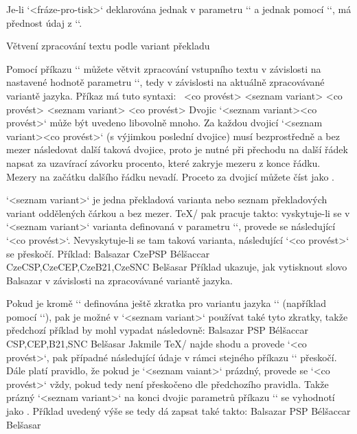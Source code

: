 Je-li `<fráze-pro-tisk>` deklarována jednak v parametru `\Note` a jednak
pomocí `\wdef`, má přednost údaj z `\wdef`.

\secc Větvení zpracování textu podle variant překladu

\mnote{\code{\\switch}}
Pomocí příkazu `\switch` můžete větvit zpracování vstupního textu v
závislosti na nastavené hodnotě parametru `\tmark`, tedy v závislosti na
aktuálně zpracovávané variantě jazyka. Příkaz má tuto syntaxi:
\begtt
{} {<co provést>}%
        {<seznam variant>} {<co provést>}%
        {<seznam variant>} {<co provést>}
\endtt
Dvojic `{<seznam variant>}{<co provést>}` může být uvedeno libovolně mnoho.
Za každou dvojicí `{<seznam variant>}{<co provést>}` (s výjimkou poslední
dvojice) musí bezprostředně a bez mezer následovat další taková dvojice,
proto je nutné při přechodu na
další řádek napsat za uzavírací závorku procento, které zakryje mezeru z
konce řádku. Mezery na začátku dalšího řádku nevadí.
Proceto za dvojicí můžete číst jako .

`<seznam variant>` je
jedna překladová varianta nebo seznam překladových variant oddělených
čárkou a bez mezer. \TeX/ pak pracuje takto: vyskytuje-li
se v `<seznam variant>` varianta definovaná v parametru `\tmark`, provede se
následující `<co provést>`. Nevyskytuje-li se tam taková varianta,
následující `<co provést>` se přeskočí. Příklad:
\begtt
{} {Balsazar}%
        {CzePSP} {Bélšaccar}%
        {CzeCSP,CzeCEP,CzeB21,CzeSNC} {Belšasar}
\endtt
Příklad ukazuje, jak vytisknout slovo Balsazar v závislosti na
zpracovávané variantě jazyka.

\mnote{\code{\\smark}}
Pokud je kromě `\tmark` definována ještě
zkratka pro variantu jazyka `\smark` (například pomocí `\def\smark{CEP}`),
pak je možné v `<seznam variant>` používat také tyto zkratky, takže předchozí
příklad  by mohl vypadat následovně:
\begtt
{}  {Balsazar}%
        {PSP}  {Bélšaccar}%
        {CSP,CEP,B21,SNC} {Belšasar}
\endtt
Jakmile \TeX/ najde shodu a provede `<co provést>`, pak případné následující
údaje v rámci stejného příkazu `\switch` přeskočí. Dále platí pravidlo, že
pokud je `<seznam vaiant>` prázdný, provede se `<co provést>` vždy, pokud
tedy není přeskočeno dle předchozího pravidla. Takže prázný `<seznam variant>` na
konci dvojic parametrů příkazu `\switch` se vyhodnotí jako . Příklad uvedený výše se tedy dá zapsat také takto:
\begtt
{} {Balsazar}%
        {PSP} {Bélšaccar}%
        {}    {Belšasar}
\endtt

